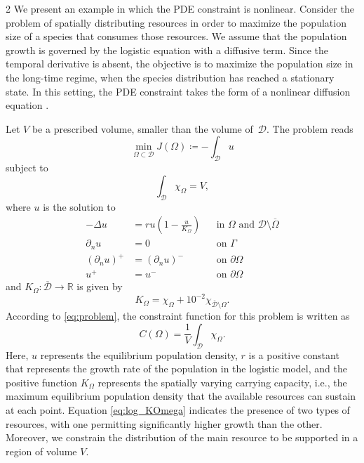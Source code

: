 \documentclass[a4paper, oneside]{article}
\begin{document}
\begin{multicols}{2}
We present an example in which the PDE constraint is nonlinear.
Consider the problem of spatially distributing resources in order
to maximize the population size of a species that consumes those resources.
We assume that the population growth is governed by the logistic equation with a diffusive term.
Since the temporal derivative is absent, the objective is to maximize the population size in the long-time regime,
when the species distribution has reached a stationary state.
In this setting, the PDE constraint takes the form
of a nonlinear diffusion equation \cite{MR1908418}.

Let $V$ be a prescribed volume, smaller than the volume of~$\mathcal{D}$.
The problem reads
\begin{equation} \label{eq:log_cost}
	\min_{\Omega \subset \mathcal{D}}
	J(\Omega) \coloneqq -\int_{\mathcal{D}} u
\end{equation}
subject to
\begin{equation}
	\int_{\mathcal{D}} \chi_{\Omega} = V,
\end{equation}
where $u$ is the solution to
\begin{equation}\label{eq:log_prob}
	\begin{aligned}
	-\Delta u &= r u \left(1-\frac{u}{K_\Omega}\right) && \text{in } \Omega \text{ and } \mathcal{D}\setminus\overline{\Omega}\\
    \partial_{n} u &= 0 && \text{on } \Gamma\\     
	(\partial_n u)^+ &= (\partial_n u)^- && \text{on } \partial\Omega \\ 
				u^+ &= u^- && \text{on } \partial\Omega
	\end{aligned}
\end{equation}
and $K_{\Omega}:\overline{\mathcal{D}} \rightarrow \mathds{R}$ is given by
\begin{equation}\label{eq:log_KOmega}
	K_{\Omega} = \chi_{\Omega} + {10}^{-2}\chi_{\overline{\mathcal{D}}\setminus\Omega}.
\end{equation}
According to \eqref{eq:problem}, the constraint function for this problem is written as
\begin{equation} \label{eq:log_const}
	C(\Omega) = \frac{1}{V} \int_{\mathcal{D}} \chi_{\Omega}.
\end{equation}
Here, $u$ represents the equilibrium population density,
$r$ is a positive constant that represents the growth rate of the population in the logistic model,
and the positive function $K_{\Omega}$ represents the spatially varying carrying capacity, i.e.,
the maximum equilibrium population density that the available resources can sustain at each point.
Equation \eqref{eq:log_KOmega} indicates the presence of two types of resources,
with one permitting significantly higher growth than the other.
Moreover, we constrain the distribution of the main resource
to be supported in a region of volume $V$.


\end{multicols}
\end{document}
